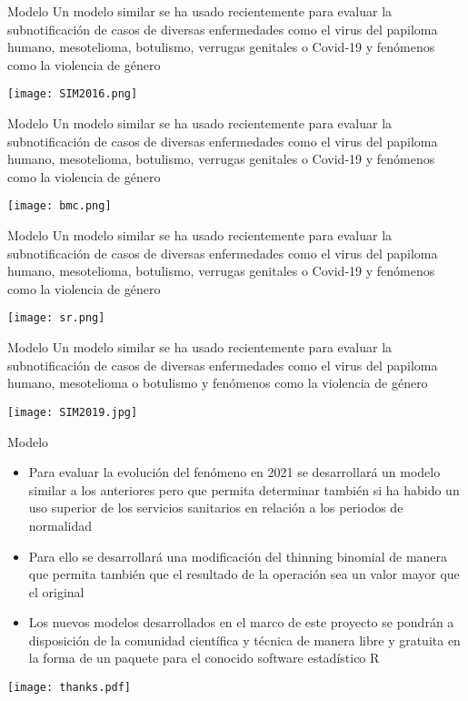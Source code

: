 \documentclass[
    10pt,
    aspectratio=169,
    usenames,
    dvipsnames
]{beamer}
\begin{document}
\begin{frame}[fragile]{Modelo}
Un modelo similar se ha usado recientemente para evaluar la subnotificación de casos de diversas enfermedades como el virus del papiloma humano,
mesotelioma, botulismo, verrugas genitales o Covid-19 y fenómenos como la violencia de género

\centering
\texttt{[image: SIM2016.png]}
\end{frame}

\begin{frame}[fragile]{Modelo}
Un modelo similar se ha usado recientemente para evaluar la subnotificación de casos de diversas enfermedades como el virus del papiloma humano,
mesotelioma, botulismo, verrugas genitales o Covid-19 y fenómenos como la violencia de género

\centering
\texttt{[image: bmc.png]}
\end{frame}

\begin{frame}[fragile]{Modelo}
Un modelo similar se ha usado recientemente para evaluar la subnotificación de casos de diversas enfermedades como el virus del papiloma humano,
mesotelioma, botulismo, verrugas genitales o Covid-19 y fenómenos como la violencia de género

\centering
\texttt{[image: sr.png]}
\end{frame}

\begin{frame}[fragile]{Modelo}
Un modelo similar se ha usado recientemente para evaluar la subnotificación de casos de diversas enfermedades como el virus del papiloma humano,
mesotelioma o botulismo y fenómenos como la violencia de género

\centering
\texttt{[image: SIM2019.jpg]}
\end{frame}

\begin{frame}{Modelo}
\begin{itemize}
 \item Para evaluar la evolución del fenómeno en 2021 se desarrollará un modelo similar a los
anteriores pero que permita determinar también si ha habido un uso superior de los
servicios sanitarios en relación a los periodos de normalidad
 \item Para ello se desarrollará una modificación del thinning binomial de manera que
permita también que el resultado de la operación sea un valor mayor que el original
 \item Los nuevos modelos desarrollados en el marco de este proyecto se pondrán a disposición
de la comunidad científica y técnica de manera libre y gratuita en la forma de un
paquete para el conocido software estadístico R
\end{itemize}
\end{frame}

\begin{frame}[plain]
\centering
\texttt{[image: thanks.pdf]}
\end{frame}
\end{document}

